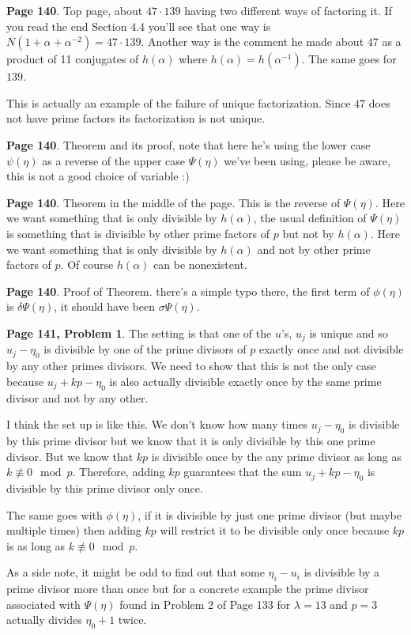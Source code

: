 \documentclass[aps,preprint,preprintnumbers,nofootinbib,showpacs,prd]{revtex4-1}
\begin{document}
{\bf Page 140}. Top page, about $47 \cdot 139$ having two different ways of factoring it. If you read the end Section 4.4 you'll see that one way is $N(1 + \alpha + \alpha^{-2}) = 47 \cdot 139$. Another way is the comment he made about $47$ as a product of 11 conjugates of $h(\alpha)$ where $h(\alpha) = h(\alpha^{-1})$. The same goes for $139$.

This is actually an example of the failure of unique factorization. Since $47$ does not have prime factors its factorization is not unique.

{\bf Page 140}. Theorem and its proof, note that here he's using the lower case $\psi(\eta)$ as a reverse of the upper case $\Psi(\eta)$ we've been using, please be aware, this is not a good choice of variable :)

{\bf Page 140}. Theorem in the middle of the page. This is the reverse of $\Psi(\eta)$. Here we want something that is only divisible by $h(\alpha)$, the usual definition of $\Psi(\eta)$ is something that is divisible by other prime factors of $p$ but not by $h(\alpha)$. Here we want something that is only divisible by $h(\alpha)$ and not by other prime factors of $p$. Of course $h(\alpha)$ can be nonexistent.

{\bf Page 140}. Proof of Theorem. there's a simple typo there, the first term of $\phi(\eta)$ is $\delta\Psi(\eta)$, it should have been $\sigma\Psi(\eta)$.

{\bf Page 141, Problem 1}. The setting is that one of the $u$'s, $u_j$ is unique and so $u_j - \eta_0$ is divisible by one of the prime divisors of $p$ exactly once and not divisible by any other primes divisors. We need to show that this is not the only case because $u_j + kp - \eta_0$ is also actually divisible exactly once by the same prime divisor and not by any other.

I think the set up is like this. We don't know how many times $u_j - \eta_0$ is divisible by this prime divisor but we know that it is only divisible by this one prime divisor. But we know that $kp$ is divisible once by the any prime divisor as long as $k \not\equiv 0 \mod p$. Therefore, adding $kp$ guarantees that the sum $u_j + kp - \eta_0$ is divisible by this prime divisor only once.

The same goes with $\phi(\eta)$, if it is divisible by just one prime divisor (but maybe multiple times) then adding $kp$ will restrict it to be divisible only once because $kp$ is as long as $k \not\equiv 0 \mod p$.

As a side note, it might be odd to find out that some $\eta_i - u_i$ is divisible by a prime divisor more than once but for a concrete example the prime divisor associated with $\Psi(\eta)$ found in Problem 2 of Page 133 for $\lambda = 13$ and $p = 3$ actually divides $\eta_0 + 1$ twice.
\end{document}
